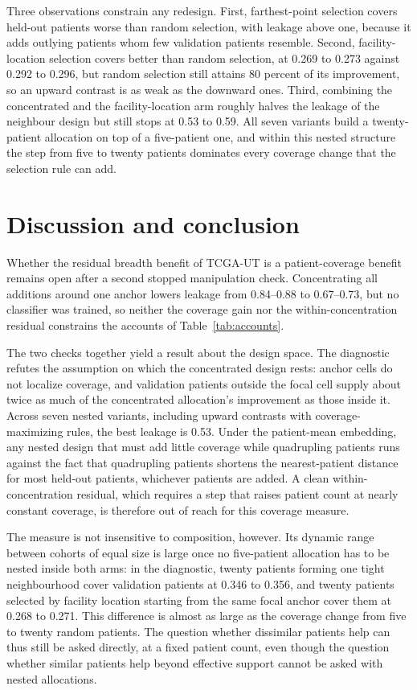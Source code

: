 Three observations constrain any redesign. First, farthest-point selection covers held-out patients worse than random selection, with leakage above one, because it adds outlying patients whom few validation patients resemble. Second, facility-location selection covers better than random selection, at 0.269 to 0.273 against 0.292 to 0.296, but random selection still attains 80 percent of its improvement, so an upward contrast is as weak as the downward ones. Third, combining the concentrated and the facility-location arm roughly halves the leakage of the neighbour design but still stops at 0.53 to 0.59. All seven variants build a twenty-patient allocation on top of a five-patient one, and within this nested structure the step from five to twenty patients dominates every coverage change that the selection rule can add.

\section{Discussion and conclusion}
\label{sec:discussion}
Whether the residual breadth benefit of TCGA-UT is a patient-coverage benefit remains open after a second stopped manipulation check. Concentrating all additions around one anchor lowers leakage from 0.84--0.88 to 0.67--0.73, but no classifier was trained, so neither the coverage gain nor the within-concentration residual constrains the accounts of Table~\ref{tab:accounts}.

The two checks together yield a result about the design space. The diagnostic refutes the assumption on which the concentrated design rests: anchor cells do not localize coverage, and validation patients outside the focal cell supply about twice as much of the concentrated allocation's improvement as those inside it. Across seven nested variants, including upward contrasts with coverage-maximizing rules, the best leakage is 0.53. Under the patient-mean embedding, any nested design that must add little coverage while quadrupling patients runs against the fact that quadrupling patients shortens the nearest-patient distance for most held-out patients, whichever patients are added. A clean within-concentration residual, which requires a step that raises patient count at nearly constant coverage, is therefore out of reach for this coverage measure.

The measure is not insensitive to composition, however. Its dynamic range between cohorts of equal size is large once no five-patient allocation has to be nested inside both arms: in the diagnostic, twenty patients forming one tight neighbourhood cover validation patients at 0.346 to 0.356, and twenty patients selected by facility location starting from the same focal anchor cover them at 0.268 to 0.271. This difference is almost as large as the coverage change from five to twenty random patients. The question whether dissimilar patients help can thus still be asked directly, at a fixed patient count, even though the question whether similar patients help beyond effective support cannot be asked with nested allocations.

